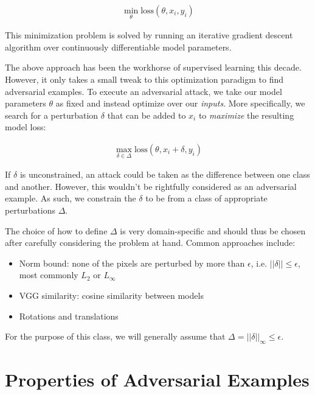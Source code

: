\documentclass[10pt]{article}
\begin{document}
\begin{align*}
\min_\theta \text{loss}(\theta, x_i, y_i)
\end{align*}

This minimization problem is solved by running an iterative gradient descent algorithm over continuously differentiable model parameters.

The above approach has been the workhorse of supervised learning this decade. However, it only takes a small tweak to this optimization paradigm to find adversarial examples. To execute an adversarial attack, we take our model parameters $\theta$ as fixed and instead optimize over our \textit{inputs}. More specifically, we search for a perturbation $\delta$ that can be added to $x_i$ to \textit{maximize} the resulting model loss:

\begin{align*}
\max_{\delta\in\Delta} \text{loss}(\theta, x_i + \delta, y_i)
\end{align*}

If $\delta$ is unconstrained, an attack could be taken as the difference between one class and another. However, this wouldn't be rightfully considered as an adversarial example. 
As such, we constrain the $\delta$ to be from a class of appropriate perturbations $\Delta$.

The choice of how to define $\Delta$ is very domain-specific and should thus be chosen after carefully considering the problem at hand. Common approaches include:

\begin{itemize}
  \item Norm bound: none of the pixels are perturbed by more than $\epsilon$, i.e. $||\delta|| \leq \epsilon$, most commonly $L_2$ or $L_\infty$ 
  \item VGG similarity: cosine similarity between models
  \item Rotations and translations
\end{itemize}

For the purpose of this class, we will generally assume that $\Delta = ||\delta||_\infty \leq \epsilon$.


\section{Properties of Adversarial Examples}
\end{document}
